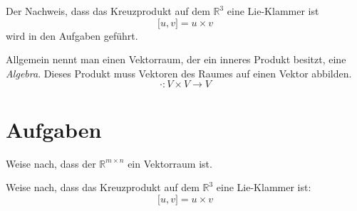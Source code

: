 Der Nachweis, dass das Kreuzprodukt auf dem $\mathbb{R}^3$ eine Lie-Klammer ist
\[
\lbrack u,v \rbrack = u \times v
\]
wird in den Aufgaben geführt. 

Allgemein nennt man einen Vektorraum, der ein inneres Produkt besitzt, eine \emph{Algebra}. Dieses Produkt muss Vektoren des Raumes auf einen Vektor abbilden. 
\begin{equation}
\cdot : V\times V \longrightarrow V
\end{equation}

\section{Aufgaben}

\begin{prob}
\label{matrix.1}

Weise nach, dass der $\mathbb{R}^{m\times n}$ ein Vektorraum ist. 

\end{prob}

\begin{prob}
\label{lie}
Weise nach, dass das Kreuzprodukt auf dem $\mathbb{R}^3$ eine Lie-Klammer ist:
\[
\lbrack u,v \rbrack = u \times v
\]
\end{prob}

